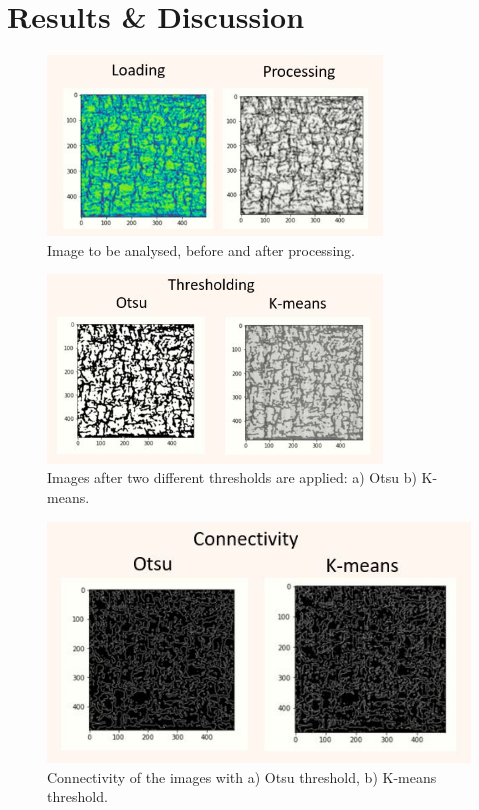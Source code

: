 \section{Results \& Discussion}

\begin{figure}[h] %
    \centering
    \includegraphics[width=3.5in]{Figures/4-Results/loading&processing.JPG}
    \caption{Image to be analysed, before and after processing.}
    \label{fig:limitationrhcf}
\end{figure}


\begin{figure}[h] %
    \centering
    \includegraphics[width=3.5in]{Figures/4-Results/thresholding.JPG}
    \caption{Images after two different thresholds are applied: a) Otsu b) K-means.}
    \label{fig:limitationrhcf}
\end{figure}

\begin{figure}[h] %
    \centering
    \includegraphics[width=5in]{Figures/4-Results/Connectivity.JPG}
    \caption{Connectivity of the images with a) Otsu threshold, b) K-means threshold.}
    \label{fig:limitationrhcf}
\end{figure}